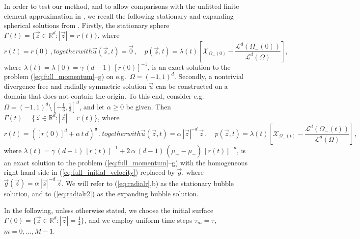 \documentclass[a4paper,11pt,onecolumn]{article}
\newcommand{\R}{{\mathbb R}}
\newcommand{\bigchi}{\ensuremath{\mathrm{\mathcal{X}}}}
\newcommand{\charfcn}[1]{\bigchi_{#1}} %
\begin{document}
In order to test our method, and to allow comparisons with the unfitted finite
element approximation in \cite{spurious}, we recall the following stationary
and expanding spherical solutions from \cite{spurious}. Firstly, the stationary
sphere $\Gamma(t) = \{ \vec z \in \R^d : |\vec z| = r(t)\}$, where
\begin{subequations}
\begin{equation} \label{eq:radialr}
r(t) = r(0)\,,
\end{equation}
together with
\begin{equation} \label{eq:radialup}
\vec u(\vec z, t) = \vec 0 \,,\quad p(\vec z, t) =
\lambda(t)\left[\charfcn{\Omega_-(0)}
-\frac{\mathcal{L}^d(\Omega_-(0))}{\mathcal{L}^d(\Omega)} \right] ,
\end{equation}
\end{subequations}
where $\lambda(t) = \lambda(0) = \gamma\,(d-1)\,[r(0)]^{-1}$, is an exact
solution to the problem (\ref{eq:full_momentum}--g) on e.g.\ $\Omega =
(-1,1)^d$. Secondly, a nontrivial divergence free and radially symmetric
solution $\vec u$ can be constructed on a domain that does not contain the
origin. To this end, consider e.g.\ $\Omega = (-1,1)^d \setminus [-\frac13,
\frac13]^d$, and let $\alpha \geq 0$ be given. Then $\Gamma(t) = \{ \vec z \in
\R^d : |\vec z| = r(t)\}$, where
\begin{subequations}
\begin{equation} \label{eq:radialr2}
r(t) = ([r(0)]^d + \alpha\,t\,d)^\frac1d \,,
\end{equation}
together with
\begin{equation} \label{eq:radialup2}
\vec u(\vec z, t) = \alpha\,|\vec z|^{-d}\,\vec z \,, \quad p(\vec z, t) =
\lambda(t)\left[ \charfcn{\Omega_-(t)} -
\frac{\mathcal{L}^d(\Omega_-(t))}{\mathcal{L}^d(\Omega)}\right],
\end{equation}
\end{subequations}
where $\lambda(t) = \gamma\,(d-1)\,[r(t)]^{-1}
+ 2\,\alpha\,(d-1)\,(\mu_+ - \mu_-)\,[r(t)]^{-d}$, is an exact solution to the
problem (\ref{eq:full_momentum}--g) with the homogeneous right hand side in
(\ref{eq:full_initial_velocity}) replaced by $\vec g$, where $\vec g(\vec z) =
\alpha\,|\vec z|^{-d}\,\vec z$. We will refer to (\ref{eq:radialr},b) as the
stationary bubble solution, and to (\ref{eq:radialr2}) as the expanding bubble
solution.

In the following, unless otherwise stated, we choose the initial surface
$\Gamma(0) = \{ \vec z \in \R^d : |\vec z| = \frac12 \}$, and we employ
uniform time steps $\tau_m=\tau$, $m=0,\ldots, M-1$.
\end{document}
